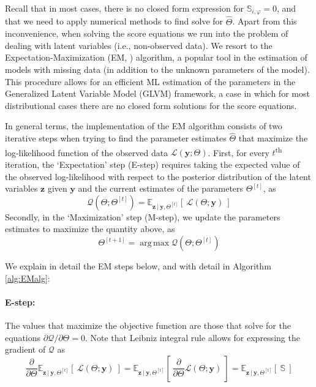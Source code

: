 \documentclass[11pt, a4paper]{article}
\DeclareMathOperator*{\argmax}{\arg\,\max}
\newcommand{\cond}{\!~|~\!}
\begin{document}
Recall that in most cases, there is no closed form expression for  $\mathbb{S}_{i,\varphi} = 0$, and that we need to apply numerical methods to find solve for $\hat{\Theta}$. Apart from this inconvenience, when solving the score equations we run into the problem of dealing with latent variables (i.e., non-observed data). We resort to the Expectation-Maximization (EM, \citealp{DempsterEtAl_JRSS1977, Bock&Aitkin_Psychometrika1981}) algorithm, a popular tool in the estimation of models with missing data (in addition to the unknown parameters of the model). This procedure allows for an efficient ML estimation of the parameters in the Generalized Latent Variable Model (GLVM) framework, a case in which for most distributional cases there are no closed form solutions for the score equations.

In general terms, the implementation of the EM algorithm consists of two iterative steps when trying to find the parameter estimates $\hat{\Theta}$ that maximize the log-likelihood function of the observed data $\mathcal{L}(\mathbf{y};\Theta)$. First, for every $t$\textsuperscript{th} iteration, the `Expectation' step (E-step) requires taking the expected value of the observed log-likelihood with respect to the posterior distribution of the latent variables $\mathbf{z}$ given $\mathbf{y}$ and the current estimates of the parameters $\Theta^{[t]}$, as
\begin{equation*}
\mathcal{Q}(\Theta;\Theta^{[t]}) = \mathbb{E}_{\mathbf{z} \cond \mathbf{y}, \Theta^{[t]}}\left[\!~\mathcal{L}(\Theta; \mathbf{y})\!~\right]
\end{equation*}
Secondly, in the `Maximization' step (M-step), we update the parameters estimates to maximize the quantity above, as
\begin{equation*}
\Theta^{[t+1]} = \argmax \mathcal{Q}(\Theta;\Theta^{[t]})
\end{equation*}

We explain in detail the EM steps below, and with detail in Algorithm \ref{alg:EMalg}:

\paragraph{E-step:} The values that maximize the objective function are those that solve for the equations $\partial \mathcal{Q} / \partial \Theta = 0$. Note that Leibniz integral rule allows for expressing the gradient of $\mathcal{Q}$  as
\begin{equation*}
\dfrac{\partial}{\partial \Theta} \mathbb{E}_{\mathbf{z} \cond \mathbf{y}, \Theta^{[t]}} \left[\!~\mathcal{L}(\Theta; \mathbf{y})\!~\right] = \mathbb{E}_{\mathbf{z} \cond \mathbf{y}, \Theta^{[t]}} \left[\!~\dfrac{\partial}{\partial \Theta} \mathcal{L}(\Theta; \mathbf{y})\!~\right] = \mathbb{E}_{\mathbf{z} \cond \mathbf{y}, \Theta^{[t]}} \left[\!~\mathbb{S} \!~\right]
\end{equation*}
\end{document}
